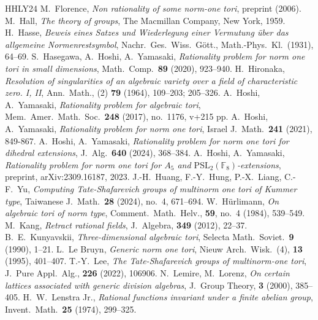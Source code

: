 \documentclass[12pt]{amsart}
\theoremstyle{plain}
\theoremstyle{definition}
\numberwithin{thm}{section}
\numberwithin{equation}{section}
\begin{document}
\begin{thebibliography}{HHLY24}
M.~Florence, \emph{Non rationality of some norm-one tori}, preprint (2006).
M.~Hall, \emph{The theory of groups}, The Macmillan Company, New York, 1959. 
H.~Hasse, \emph{Beweis eines Satzes und Wiederlegung einer Vermutung {\"u}ber das allgemeine Normenrestsymbol}, Nachr.~Ges.~Wiss.~G{\"o}tt., Math.-Phys.~Kl.~(1931), 64--69.  
S.~Hasegawa, A.~Hoshi, A.~Yamasaki, \emph{Rationality problem for norm one tori in small dimensions}, Math.~Comp.~\textbf{89} (2020), 923--940. 
H.~Hironaka, \emph{Resolution of singularities of an algebraic variety over a field of characteristic zero. I, II}, Ann.~Math., (2) \textbf{79} (1964), 109--203; 205--326. 
A.~Hoshi, A.~Yamasaki, \emph{Rationality problem for algebraic tori}, Mem.~Amer.~Math.~Soc.~\textbf{248} (2017), no.~1176, v+215 pp. 
A.~Hoshi, A.~Yamasaki, \emph{Rationality problem for norm one tori}, Israel J.~Math.~\textbf{241} (2021), 849-867. 
A.~Hoshi, A.~Yamasaki, \emph{Rationality problem for norm one tori for dihedral extensions}, J.~Alg.~\textbf{640} (2024), 368--384. 
A.~Hoshi, A.~Yamasaki, \emph{Rationality problem for norm one tori for $A_{5}$ and $\mathrm{PSL}_{2}(\mathbb{F}_{8})$-extensions}, preprint, arXiv:2309.16187, 2023. 
J.-H.~Huang, F.-Y.~Hung, P.-X.~Liang, C.-F.~Yu, \emph{Computing Tate-Shafarevich groups of multinorm one tori of Kummer type}, Taiwanese J.~Math.~\textbf{28} (2024), no.~4, 671--694.  
W.~H{\"u}rlimann, \emph{On algebraic tori of norm type}, Comment.~Math.~Helv., \textbf{59}, no.~4 (1984), 539--549. 
M.~Kang, \emph{Retract rational fields}, J.~Algebra, \textbf{349} (2012), 22--37.
B.~E.~Kunyavskii, \emph{Three-dimensional algebraic tori}, Selecta Math.~Soviet.~\textbf{9} (1990), 1--21. 
L.~Le Bruyn, \emph{Generic norm one tori}, Nieuw Arch.~Wisk.~(4), \textbf{13} (1995), 401--407. 
T.-Y.~Lee, \emph{The Tate-Shafarevich groups of multinorm-one tori}, J.~Pure Appl.~Alg., \textbf{226} (2022), 106906. 
N.~Lemire, M.~Lorenz, \emph{On certain lattices associated with generic division algebras}, J.~Group Theory, \textbf{3} (2000), 385--405.
H.~W.~Lenstra Jr., \emph{Rational functions invariant under a finite abelian group}, Invent.~Math.~\textbf{25} (1974), 299--325. 

\end{thebibliography}
\end{document}

